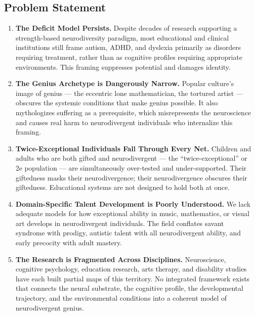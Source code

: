 \documentclass[11pt,letterpaper]{article}
\begin{document}
\subsection{Problem Statement}

\begin{enumerate}[leftmargin=*, label=\textbf{P\arabic*.}]
  \item \textbf{The Deficit Model Persists.} Despite decades of research supporting a strength-based neurodiversity paradigm, most educational and clinical institutions still frame autism, ADHD, and dyslexia primarily as disorders requiring treatment, rather than as cognitive profiles requiring appropriate environments. This framing suppresses potential and damages identity.

  \item \textbf{The Genius Archetype is Dangerously Narrow.} Popular culture's image of genius — the eccentric lone mathematician, the tortured artist — obscures the systemic conditions that make genius possible. It also mythologizes suffering as a prerequisite, which misrepresents the neuroscience and causes real harm to neurodivergent individuals who internalize this framing.

  \item \textbf{Twice-Exceptional Individuals Fall Through Every Net.} Children and adults who are both gifted and neurodivergent — the ``twice-exceptional'' or 2e population — are simultaneously over-tested and under-supported. Their giftedness masks their neurodivergence; their neurodivergence obscures their giftedness. Educational systems are not designed to hold both at once.

  \item \textbf{Domain-Specific Talent Development is Poorly Understood.} We lack adequate models for how exceptional ability in music, mathematics, or visual art develops in neurodivergent individuals. The field conflates savant syndrome with prodigy, autistic talent with all neurodivergent ability, and early precocity with adult mastery.

  \item \textbf{The Research is Fragmented Across Disciplines.} Neuroscience, cognitive psychology, education research, arts therapy, and disability studies have each built partial maps of this territory. No integrated framework exists that connects the neural substrate, the cognitive profile, the developmental trajectory, and the environmental conditions into a coherent model of neurodivergent genius.
\end{enumerate}
\end{document}
